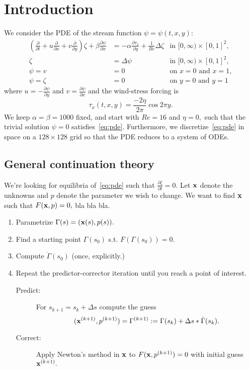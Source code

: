 \section{Introduction}

We consider the PDE of the stream function $\psi = \psi(t, x, y):$
\begin{equation}\label{eq:pde}
\begin{aligned}
  \left(\frac{\partial}{\partial t} + u \frac{\partial}{\partial x} + v \frac{\partial}{\partial y}\right) \zeta + \beta \frac{\partial \psi}{\partial x} &= -\alpha \frac{\partial \tau_x}{\partial y} + \frac{1}{Re} \Delta \zeta & \text{in } [0, \infty) \times [0,1]^2, \\
  \zeta &= \Delta \psi & \text{in } [0, \infty) \times [0,1]^2, \\
  \psi = v &= 0 & \text{on } x = 0 \text{ and } x = 1, \\
  \psi = \zeta &= 0 & \text{on } y = 0 \text{ and } y = 1
\end{aligned}
\end{equation}
where $u = -\frac{\partial \psi}{\partial y}$ and $v = \frac{\partial \psi}{\partial x}$ and the wind-stress forcing is
\begin{equation}
  \tau_x(t, x, y) = \frac{-2 \eta}{2 \pi} \cos{2\pi y}.
\end{equation}
We keep $\alpha = \beta = 1000$ fixed, and start with $Re = 16$ and $\eta = 0,$ such that the trivial solution $\psi = 0$ satisfies~\eqref{eq:pde}. Furthermore, we discretize~\eqref{eq:pde} in space on a $128\times128$ grid so that the PDE reduces to a system of ODEs.

\subsection{General continuation theory}
We're looking for equilibria of~\eqref{eq:pde} such that $\frac{\partial \zeta}{\partial t} = 0.$ Let $\mathbf{x}$ denote the unknowns and $p$ denote the parameter we wish to change. We want to find $\mathbf{x}$ such that $F(\mathbf{x}, p) = 0,$ bla bla bla. 

\begin{enumerate}
  \item Parametrize $\Gamma(s) = (\mathbf{x}(s), p(s)).$
  \item Find a starting point $\Gamma(s_0)$ s.t. $F(\Gamma(s_0)) = 0.$
  \item Compute $\dot\Gamma(s_0)$ (once, explicitly.)
  \item Repeat the predictor-corrector iteration until you reach a point of interest.
  \begin{description}
    \item[Predict:] For $s_{k+1} = s_k + \Delta s$ compute the guess $$(\mathbf{x}^{(k+1)}, p^{(k+1)}) = \Gamma^{(k+1)} := \Gamma(s_k) + \Delta s * \dot\Gamma(s_k).$$
    \item[Correct:] Apply Newton's method in $\mathbf{x}$ to $F(\mathbf{x}, p^{(k+1)}) = 0$ with initial guess $\mathbf{x}^{(k+1)}.$
  \end{description}
\end{enumerate}